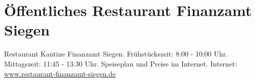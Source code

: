 \section{Öffentliches Restaurant Finanzamt Siegen}
Restaurant Kantine Finanzamt Siegen. Frühstückszeit: 8:00 - 10:00 Uhr.  Mittagszeit: 11:45 - 13:30 Uhr. Speiseplan und Preise im Internet. Internet: \href{http://www.restaurant-finanzamt-siegen.de}{www.restaurant-finanzamt-siegen.de}